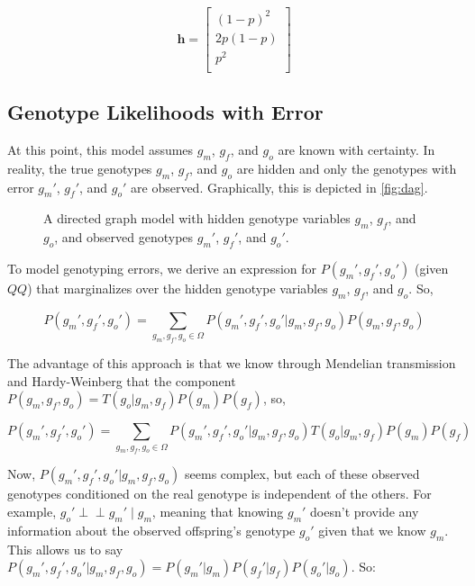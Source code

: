 \documentclass[11pt]{article}
\begin{document}
$$
\bm{h} = \left[ \begin{array}{c}
(1 - p)^2 \\
2p(1-p) \\
p^2 \\
\end{array} \right]
$$

\subsection{Genotype Likelihoods with Error}

At this point, this model assumes $g_m$, $g_f$, and $g_o$ are known with
certainty. In reality, the true genotypes $g_m$, $g_f$, and $g_o$ are hidden
and only the genotypes with error $g_m'$, $g_f'$, and $g_o'$ are observed.
Graphically, this is depicted in \autoref{fig:dag}.

\begin{figure}
\centering
\begingroup
{}%

\endgroup

\caption{A directed graph model with hidden genotype variables $g_m$, $g_f$,
and $g_o$, and observed genotypes $g_m'$, $g_f'$, and $g_o'$.}

\label{fig:dag}

\end{figure}

To model genotyping errors, we derive an expression for $P(g_m', g_f', g_o')$
(given $QQ$) that marginalizes over the hidden genotype variables $g_m$, $g_f$,
and $g_o$. So,

$$
P(g_m', g_f', g_o') = \sum_{g_m,g_f,g_o \in \Omega} P(g_m', g_f', g_o' | g_m, g_f, g_o) P(g_m, g_f, g_o)
$$

The advantage of this approach is that we know through Mendelian transmission
and Hardy-Weinberg that the component $P(g_m, g_f, g_o) = T(g_o | g_m, g_f)
P(g_m) P(g_f)$, so,

$$
P(g_m', g_f', g_o') = \sum_{g_m,g_f,g_o \in \Omega} P(g_m', g_f', g_o' | g_m, g_f, g_o) T(g_o | g_m, g_f) P(g_m) P(g_f)
$$

Now, $P(g_m', g_f', g_o' | g_m, g_f, g_o)$ seems complex, but each of these
observed genotypes conditioned on the real genotype is independent of the
others. For example, $g_o' \perp\!\!\!\perp g_m'\; | \;g_m$, meaning that
knowing $g_m'$ doesn't provide any information about the observed offspring's
genotype $g_o'$ given that we know $g_m$. This allows us to say $P(g_m', g_f',
g_o' | g_m, g_f, g_o) = P(g_m' | g_m) P(g_f'|g_f) P(g_o'|g_o)$. So:
\end{document}
